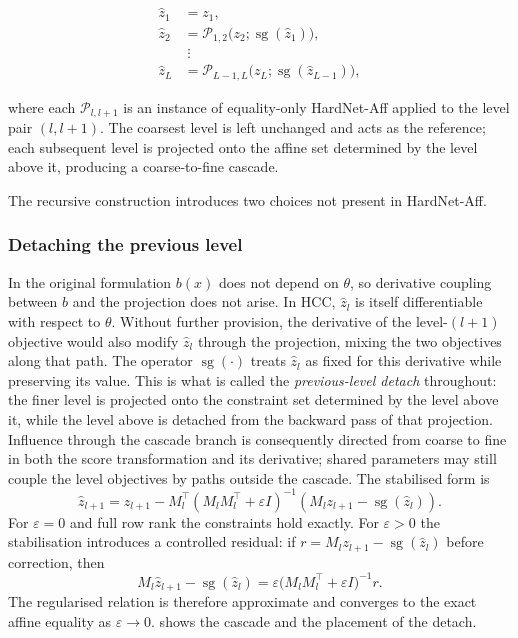 \begin{align*}
\hat z_1 &= z_1,\\
\hat z_2 &= \mathcal{P}_{1,2}\big(z_2;\operatorname{sg}(\hat z_1)\big),\\
&\;\vdots\\
\hat z_L &= \mathcal{P}_{L-1,L}\big(z_L;\operatorname{sg}(\hat z_{L-1})\big),
\end{align*}

where each $\mathcal{P}_{l,l+1}$ is an instance of equality-only HardNet-Aff applied to the
level pair $(l,l+1)$. The coarsest level is left unchanged and acts as the
reference; each subsequent level is projected onto the affine set determined by
the level above it, producing a coarse-to-fine cascade.

\medskip

The recursive construction introduces two choices not present in HardNet-Aff.

\subsubsection{Detaching the previous level}

In the original formulation $b(x)$ does not
depend on $\theta$, so derivative coupling between $b$ and the projection does not
arise. In HCC, $\hat z_l$ is itself differentiable with respect to $\theta$.
Without further provision, the derivative of the level-$(l+1)$ objective would
also modify $\hat z_l$ through the projection, mixing the two objectives along
that path. The operator $\operatorname{sg}(\cdot)$ treats $\hat z_l$ as fixed for
this derivative while preserving its value. This is what is called the
\emph{previous-level detach} throughout: the finer level is projected onto the
constraint set determined by the level above it, while the level above is detached
from the backward pass of that projection. Influence through the cascade branch
is consequently directed from coarse to fine in both the score transformation
and its derivative; shared parameters may still couple the level objectives by
paths outside the cascade. The stabilised form is
\[
\hat z_{l+1}
=
z_{l+1}
-
M_l^{\top}
\left(
M_lM_l^{\top}
+
\varepsilon I
\right)^{-1}
\left(
M_lz_{l+1}-\operatorname{sg}(\hat z_l)
\right).
\]
For $\varepsilon=0$ and full row rank the constraints hold exactly. For
$\varepsilon>0$ the stabilisation introduces a controlled residual: if
$r=M_lz_{l+1}-\operatorname{sg}(\hat z_l)$ before correction, then
\[
M_l\hat z_{l+1}-\operatorname{sg}(\hat z_l)
=\varepsilon\big(M_lM_l^\top+\varepsilon I\big)^{-1}r.
\]
The regularised relation is therefore approximate and converges to the exact
affine equality as $\varepsilon\to0$.  shows the cascade
and the placement of the detach.

